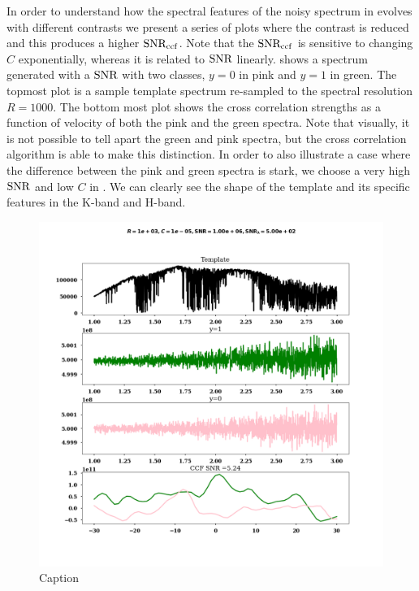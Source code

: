 In order to understand how the spectral features of the noisy spectrum in  evolves with different contrasts we present a series of plots where the contrast is reduced and this produces a higher $\rm{SNR_{ccf}}$.
Note that the $\rm{SNR_{ccf}}$ is sensitive to changing $C$ exponentially, whereas it is related to $\rm{SNR}$ linearly.
 shows a spectrum generated with a $\rm{SNR}$ with two classes, $y=0$ in pink and $y=1$ in green. 
The topmost plot is a sample template spectrum re-sampled to the spectral resolution $R=1000$.
The bottom most plot shows the cross correlation strengths as a function of velocity of both the pink and the green spectra.
Note that visually, it is not possible to tell apart the green and pink spectra, but the cross correlation algorithm is able to make this distinction.
In order to also illustrate a case where the difference between the pink and green spectra is stark, we choose a very high $\rm{SNR}$ and low $C$ in .
We can clearly see the shape of the template and its specific features in the K-band and H-band.
\begin{figure}[ht]
    \centering
    \includegraphics[width=\textwidth]{images/Chapter3/feature_compare_ccf_snr_5.24.png}
    \caption{Caption}
    \label{fig:compare-specsnr=5.24}
\end{figure}

